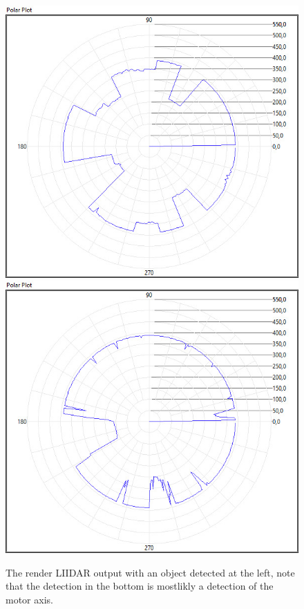 \begin{figure}[ht]
    \centering
        \includegraphics[scale=0.2]{./mesurment/data/Lidar_1ms_9_oclock_detection}
        \includegraphics[scale=0.2]{./mesurment/data/Lidar_40ms_9_oclock_detection}
  \caption{ The render LIIDAR output with an object detected at the left, note that the detection in the bottom is mostlikly a detection of the motor axis.   }
  \label{fig:lidar-images}
\end{figure}

